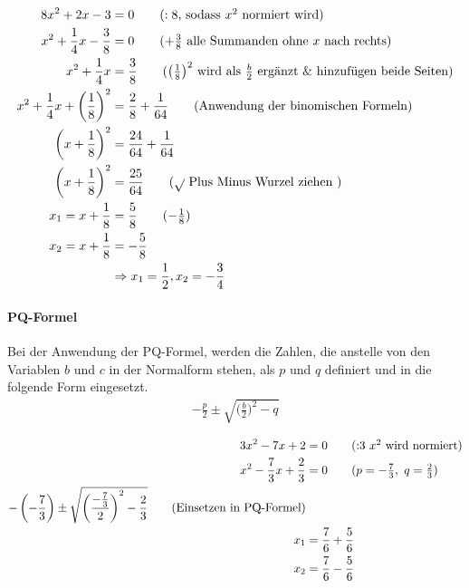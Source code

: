 \begin{beispiel}
	\begin{align*}
		8x^2+2x-3&=0\tag{$:8$, sodass $x^2$ normiert wird}\\
		x^2+\frac{1}{4}x-\frac{3}{8}&=0\tag{$+\frac{3}{8}$ alle Summanden ohne $x$ nach rechts}\\
		x^2+\frac{1}{4}x&=\frac{3}{8}\tag{$\left(\frac{1}{8}\right)^2$ wird als $\frac{b}{2}$ ergänzt \& hinzufügen beide Seiten}\\
		x^2+\frac{1}{4}x+\left(\frac{1}{8}\right)^2&=\frac{2}{8}+\frac{1}{64}\tag{Anwendung der binomischen Formeln}\\
		\left(x+\frac{1}{8}\right)^2&=\frac{24}{64}+\frac{1}{64}\\
		\left(x+\frac{1}{8}\right)^2&=\frac{25}{64}\tag{$\sqrt{ }$ Plus Minus Wurzel ziehen }\\
		x_1= x+\frac{1}{8}&=\frac{5}{8}\tag{$-\frac{1}{8}$}\\
		x_2= x+\frac{1}{8}&=-\frac{5}{8}\\
		&\Rightarrow x_1=\frac{1}{2}, x_2=-\frac{3}{4}
	\end{align*}
\end{beispiel}
\paragraph{PQ-Formel} Bei der Anwendung der PQ-Formel, werden die Zahlen, die anstelle von den Variablen $b$ und $c$ in der Normalform stehen, als $p$ und $q$ definiert und in die folgende Form eingesetzt. 
\begin{align*}
	-\frac{p}{2} \pm\sqrt{\bigg(\frac{b}{2}\bigg)^2-q}
\end{align*}

\begin{beispiel}
	\begin{align*}
		3x^2-7x+2&=0\tag{:3 $x^2$ wird normiert}\\
		x^2-\frac{7}{3}x+\frac{2}{3}&=0\tag{$p=-\frac{7}{3},\ q=\frac{2}{3}$}\\
		-\left(-\frac{7}{3}\right) \pm\sqrt{\left(\frac{-\frac{7}{3}}{2}\right)^2-\frac{2}{3}}\tag{Einsetzen in PQ-Formel}\\
		x_1&= \frac{7}{6}+\frac{5}{6}\\
		x_2&= \frac{7}{6}-\frac{5}{6}\\
	\end{align*}
\end{beispiel}